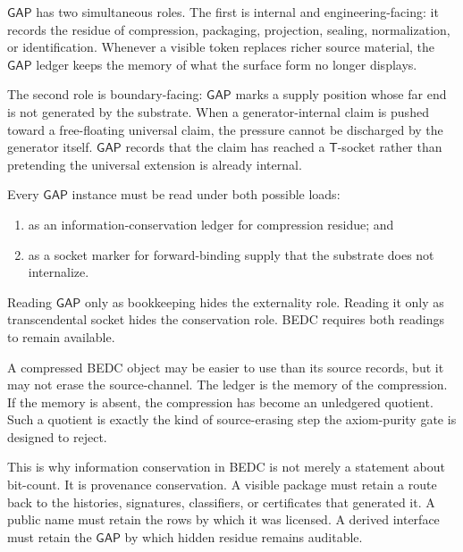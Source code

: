 $\mathsf{GAP}$ has two simultaneous roles. The first is internal and engineering-facing: it records the residue of compression, packaging, projection, sealing, normalization, or identification. Whenever a visible token replaces richer source material, the $\mathsf{GAP}$ ledger keeps the memory of what the surface form no longer displays.

The second role is boundary-facing: $\mathsf{GAP}$ marks a supply position whose far end is not generated by the substrate. When a generator-internal claim is pushed toward a free-floating universal claim, the pressure cannot be discharged by the generator itself. $\mathsf{GAP}$ records that the claim has reached a $\mathsf{T}$-socket rather than pretending the universal extension is already internal.

\begin{principle}
\label{prin:external-supply-gap-dual-role}
Every $\mathsf{GAP}$ instance must be read under both possible loads:
\begin{enumerate}
\item as an information-conservation ledger for compression residue; and
\item as a socket marker for forward-binding supply that the substrate does not internalize.
\end{enumerate}
\end{principle}

Reading $\mathsf{GAP}$ only as bookkeeping hides the externality role. Reading it only as transcendental socket hides the conservation role. BEDC requires both readings to remain available.

\begin{remark}
\label{rem:external-supply-compression-memory}
A compressed BEDC object may be easier to use than its source records, but it may not erase the source-channel. The ledger is the memory of the compression. If the memory is absent, the compression has become an unledgered quotient. Such a quotient is exactly the kind of source-erasing step the axiom-purity gate is designed to reject.
\end{remark}

This is why information conservation in BEDC is not merely a statement about bit-count. It is provenance conservation. A visible package must retain a route back to the histories, signatures, classifiers, or certificates that generated it. A public name must retain the rows by which it was licensed. A derived interface must retain the $\mathsf{GAP}$ by which hidden residue remains auditable.

